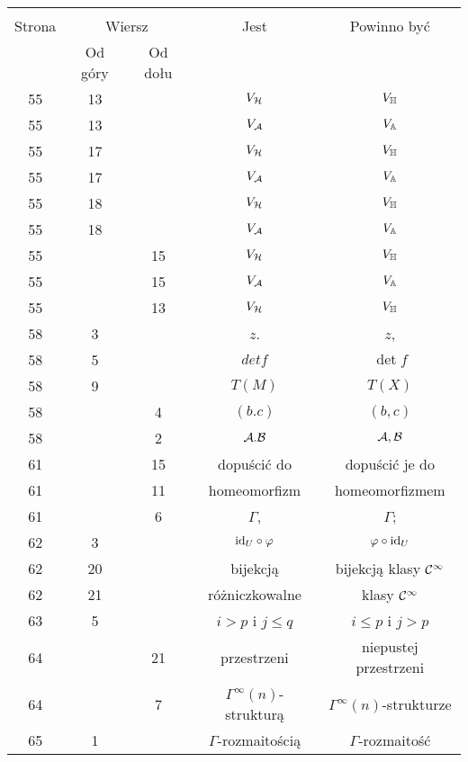 \documentclass[a4paper,11pt]{article}
\begin{document}
\begin{center}
  \begin{tabular}{|c|c|c|c|c|}
    \hline
    & \multicolumn{2}{c|}{} & & \\
    Strona & \multicolumn{2}{c|}{Wiersz} & Jest
                              & Powinno być \\ \cline{2-3}
    & Od góry & Od dołu & & \\
    \hline
    55  & 13 & & $V_{ \mathcal{H} }$ & $V_{ \mathbb{H} }$ \\
    55  & 13 & & $V_{ \mathcal{A} }$ & $V_{ \mathbb{A} }$ \\
    55  & 17 & & $V_{ \mathcal{H} }$ & $V_{ \mathbb{H} }$ \\
    55  & 17 & & $V_{ \mathcal{A} }$ & $V_{ \mathbb{A} }$ \\
    55  & 18 & & $V_{ \mathcal{H} }$ & $V_{ \mathbb{H} }$ \\
    55  & 18 & & $V_{ \mathcal{A} }$ & $V_{ \mathbb{A} }$ \\
    55  & & 15 & $V_{ \mathcal{H} }$ & $V_{ \mathbb{H} }$ \\
    55  & & 15 & $V_{ \mathcal{A} }$ & $V_{ \mathbb{A} }$ \\
    55  & & 13 & $V_{ \mathcal{H} }$ & $V_{ \mathbb{H} }$ \\
    58  &  3 & & $z$. & $z$, \\
    58  &  5 & & $det f$ & $\det f$ \\
    58  &  9 & & $T( M )$ & $T( X )$ \\
    58  & &  4 & $( b.c )$ & $( b, c )$ \\
    58  & &  2 & $\mathcal{A}.\mathcal{B}$ & $\mathcal{A}, \mathcal{B}$ \\
    61  & & 15 & dopuścić do & dopuścić je do \\
    61  & & 11 & homeomorfizm & homeomorfizmem \\
    61  & &  6 & $\Gamma$, & $\Gamma$; \\
    62  &  3 & & $\mathrm{id}_{ U } \circ \varphi$ & $\varphi \circ \mathrm{id}_{ U }$ \\
    62  & 20 & & bijekcją & bijekcją klasy $\mathcal{C}^{ \infty }$ \\
    62  & 21 & & różniczkowalne & klasy $\mathcal{C}^{ \infty }$ \\
    63  &  5 & & $i > p$ i $j \leq q$ & $i \leq p$ i $j > p$ \\
    64  & & 21 & przestrzeni & niepustej przestrzeni \\
    64  & &  7 & $\Gamma^{ \infty }( n )$-strukturą
           & $\Gamma^{ \infty }( n )$-strukturze \\
    65  &  1 & & $\Gamma$-rozmaitością & $\Gamma$-rozmaitość \\

\end{tabular}
\end{center}
\end{document}
